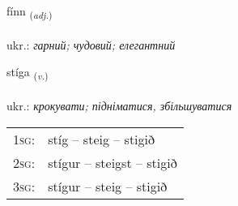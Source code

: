 \documentclass[frontgrid, backgrid]{flacards}\usepackage[]{graphicx}\usepackage[]{xcolor}
\begin{document}
\renewcommand{\flhead}{\vskip5pt \fboxsep=0pt {\small\bfseries\footnotesize Lýsingarorð | прикметник}}
\renewcommand{\fcfoot}{\vskip5pt \fboxsep=0pt \hspace{2pt}{\small\bfseries\footnotesize 2K}}

\renewcommand{\blhead}{\vskip5pt {\small\bfseries\footnotesize Lýsingarorð | прикметник }}
\renewcommand{\bcfoot}{\vskip5pt \hspace{2pt}{\small\bfseries\footnotesize 2K}}


{fínn \small{\textsubscript{(\textit{adj.})}} \\[1ex] %
\textphonetic{[fitn̥]} \\
ukr.: \emph{гарний; чудовий; елегантний} \\  [2ex]
\renewcommand*{\arraystretch}{0.8}
}

\renewcommand{\flhead}{\vskip5pt \fboxsep=0pt {\small\bfseries\footnotesize Sagnorð | дієслово}}
\renewcommand{\fcfoot}{\vskip5pt \fboxsep=0pt \hspace{2pt}{\small\bfseries\footnotesize 2K}}

\renewcommand{\blhead}{\vskip5pt {\small\bfseries\footnotesize Sagnorð | дієслово }}
\renewcommand{\bcfoot}{\vskip5pt \hspace{2pt}{\small\bfseries\footnotesize 2K}}


{stíga \small{\textsubscript{(\textit{v.})}} \\[1ex] %
\textphonetic{[stiːɣa]} \\
ukr.: \emph{крокувати; підніматися, збільшуватися} \\  [2ex]
\renewcommand*{\arraystretch}{0.8}
\begin{tabular}{p{1cm}l}
\textsc{1sg}: & stíg -- steig -- stigið \\ 
\textsc{2sg}: & stígur -- steigst -- stigið \\ 
\textsc{3sg}: & stígur -- steig -- stigið \\ 
\end{tabular}
}
\end{document}
